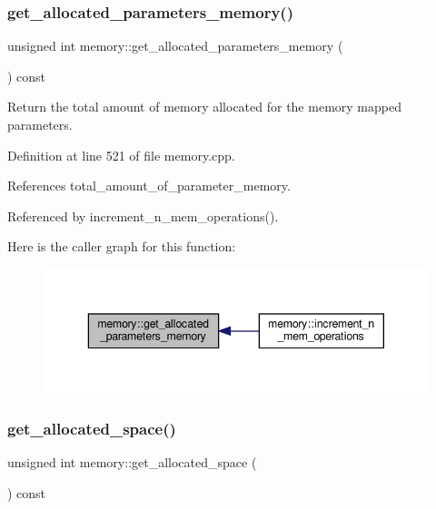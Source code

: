 \subsubsection{\texorpdfstring{get\+\_\+allocated\+\_\+parameters\+\_\+memory()}{get\_allocated\_parameters\_memory()}}
{\footnotesize\ttfamily unsigned int memory\+::get\+\_\+allocated\+\_\+parameters\+\_\+memory (\begin{DoxyParamCaption}{ }\end{DoxyParamCaption}) const}



Return the total amount of memory allocated for the memory mapped parameters. 



Definition at line 521 of file memory.\+cpp.



References total\+\_\+amount\+\_\+of\+\_\+parameter\+\_\+memory.



Referenced by increment\+\_\+n\+\_\+mem\+\_\+operations().

Here is the caller graph for this function\+:
\nopagebreak
\begin{figure}[H]
\begin{center}
\leavevmode
\includegraphics[width=343pt]{d8/d99/classmemory_a580103df3eb36abe6d53f31b7fba7fed_icgraph}
\end{center}
\end{figure}
\mbox{\label{classmemory_aca163291c5d49ad384e5af2f5eb8d20a}} 
\subsubsection{\texorpdfstring{get\+\_\+allocated\+\_\+space()}{get\_allocated\_space()}}
{\footnotesize\ttfamily unsigned int memory\+::get\+\_\+allocated\+\_\+space (\begin{DoxyParamCaption}{ }\end{DoxyParamCaption}) const}



